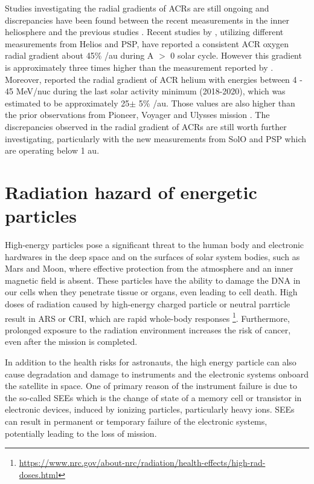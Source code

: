Studies investigating the radial gradients of \acp{ACR} are still ongoing and discrepancies have been found between the recent measurements in the inner heliosphere and the previous studies \citep{Webber1981JGR, Marsden1999AdSpR}. Recent studies by \citet{Rankin2021ApJ, Rankin2022ApJ, Marquardt2018AA}, utilizing different measurements from Helios and \ac{PSP}, have reported a consistent ACR oxygen radial gradient about 45\% /au during A $>$ 0 solar cycle. However this gradient is approximately three times higher than the measurement reported by \citet{Webber1981JGR}. Moreover, \citet{Rankin2022ApJ} reported the radial gradient of ACR helium with energies between 4 - 45 MeV/nuc during the last solar activity minimum (2018-2020), which was estimated to be approximately 25$\pm$ 5\% /au. Those values are also higher than the prior observations from Pioneer, Voyager and Ulysses mission \citep{McDonald2001ICRC, Webber1981JGR, McKibben1989JGR, McDonald1986GeoRL, Cummings1987GeoRL, Cummings1995GeoRL}. The discrepancies observed in the radial gradient of \acp{ACR} are still worth  further investigating, particularly with the new measurements from \ac{SolO} and \ac{PSP} which are operating below 1 au.


\section{Radiation hazard of energetic particles}


High-energy particles pose a significant threat to the human body and electronic hardwares in the deep space and on the surfaces of solar system bodies, such as Mars and Moon, where effective protection from the atmosphere and an inner magnetic field is absent.
These particles have the ability to damage the \ac{DNA} in our cells when they penetrate tissue or organs, even leading to cell death.
High doses of radiation caused by high-energy charged particle or neutral parrticle result in \ac{ARS} or \ac{CRI}, which are rapid whole-body responses \footnote{\url{https://www.nrc.gov/about-nrc/radiation/health-effects/high-rad-doses.html}}. Furthermore, prolonged exposure to the radiation environment increases the risk of cancer, even after the mission is completed.

In addition to the health risks for astronauts, the high energy particle can also cause degradation and damage to instruments and the electronic systems onboard the satellite in space. One of primary reason of the instrument failure is due to the so-called \acp{SEE} which is the change of state of a memory cell or transistor in electronic devices, induced by ionizing particles, particularly heavy ions. \acp{SEE} can result in permanent or temporary failure of the electronic systems, potentially leading to the loss of mission. 


